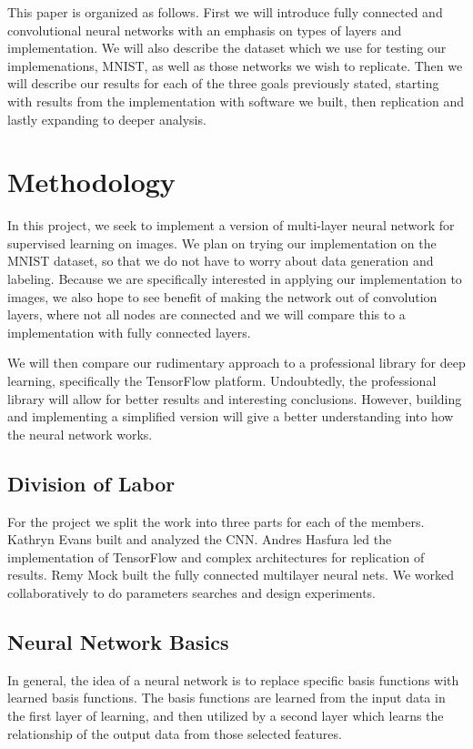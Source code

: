 \documentclass[12pt, twocolumn]{article}
\begin{document}
This paper is organized as follows. First we will introduce fully connected and convolutional neural networks with an emphasis on types of layers and implementation. We will also describe the dataset which we use for testing our implemenations, MNIST, as well as those networks we wish to replicate.  Then we will describe our results for each of the three goals previously stated, starting with results from the implementation with software we built, then replication and lastly expanding to deeper analysis. 

\section{Methodology}
In this project, we seek to implement a version of multi-layer neural network for supervised learning on images. We plan on trying our implementation on the MNIST dataset, so that we do not have to worry about data generation and labeling. Because we are specifically interested in applying our implementation to images, we also hope to see benefit of making the network out of convolution layers, where not all nodes are connected and we will compare this to a implementation with fully connected layers.

 We will then compare our rudimentary approach to a professional library for deep learning, specifically the TensorFlow platform. Undoubtedly, the professional library will allow for better results and interesting conclusions. However, building and implementing a simplified version will give a better understanding into how the neural network works. 

\subsection{Division of Labor}
	
 
 For the project we split the work into three parts for each of the members. Kathryn Evans built and analyzed the CNN. Andres Hasfura led the implementation of TensorFlow and complex architectures for replication of results. Remy Mock built the fully connected multilayer neural nets. We worked collaboratively to do parameters searches and design experiments. 

\subsection{Neural Network Basics}

In general, the idea of a neural network is to replace specific basis functions with learned basis functions. The basis functions are learned from the input data in the first layer of learning, and then utilized by a second layer which learns the relationship of the output data from those selected features.
\end{document}
